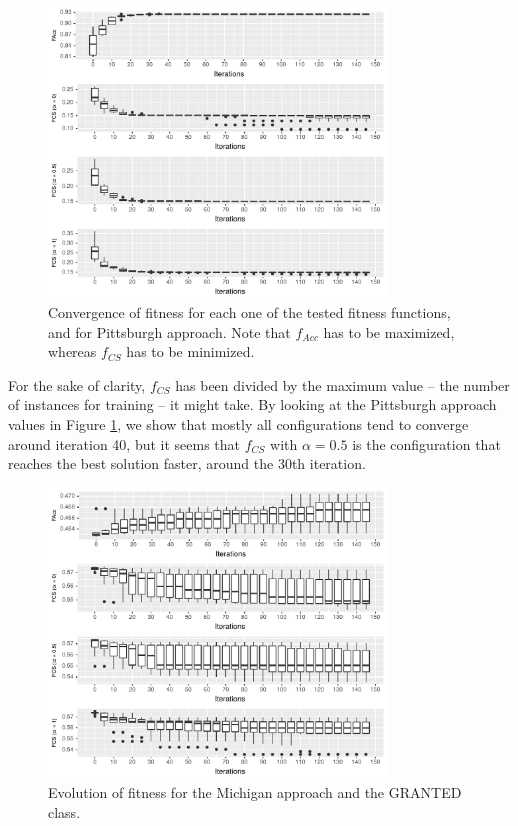 \documentclass[runningheads]{llncs}
\begin{document}
\begin{figure}[h!tb]
\centering
\includegraphics[width=0.8\textwidth]{img/pittsburghItvsF.pdf}
\caption{Convergence of fitness for each one of the tested fitness
  functions, and for Pittsburgh approach. Note that $f_{Acc}$ has to
  be maximized, whereas $f_{CS}$ has to be minimized.}
\label{fig:pittsburghItvsF}
\end{figure}
%
For the sake of clarity, $f_{CS}$ has been divided by the maximum
value -- the number of instances for training -- it might take. By
looking at the Pittsburgh approach values in Figure
\ref{fig:pittsburghItvsF}, we show that mostly all configurations tend to converge around iteration 40, but it seems that $f_{CS}$ with
$\alpha = 0.5$ is the configuration that reaches the best solution
faster, around the 30th iteration.  

\begin{figure}[h!tb]
	\centering
	\includegraphics[width=0.8\textwidth]{img/michiganItvsF_allow.pdf}
	\caption{Evolution of fitness for the Michigan approach and the GRANTED class.}
	\label{fig:michiganItvsF_allow}
\end{figure}
\end{document}
